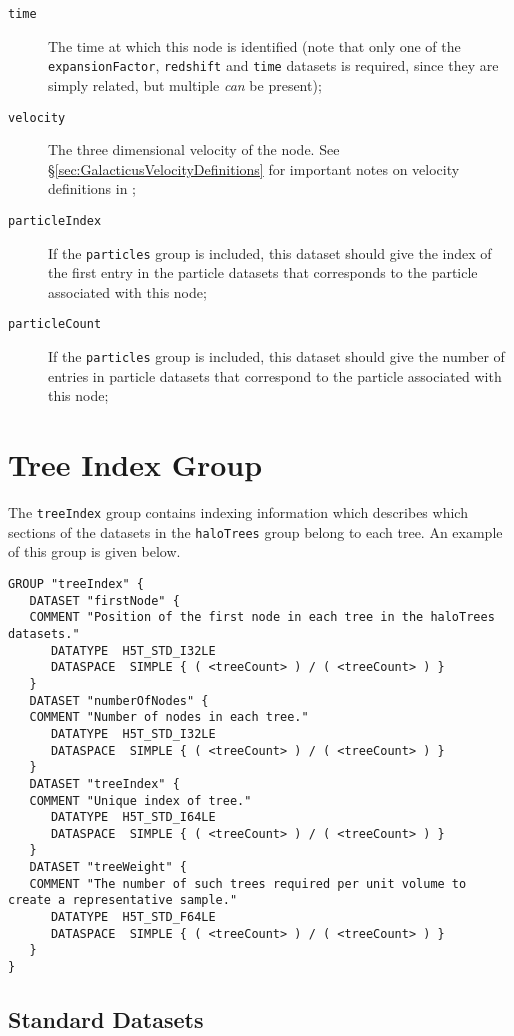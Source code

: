 \begin{description}
 \item [{\tt time}] The time at which this node is identified (note that only one of the {\tt expansionFactor}, {\tt redshift} and {\tt time} datasets is required, since they are simply related, but multiple \emph{can} be present);
 \item [{\tt velocity}] The three dimensional velocity of the node. See \S\ref{sec:GalacticusVelocityDefinitions} for important notes on velocity definitions in \glc;
 \item [{\tt particleIndex}] If the {\tt particles} group is included, this dataset should give the index of the first entry in the particle datasets that corresponds to the particle associated with this node;
 \item [{\tt particleCount}] If the {\tt particles} group is included, this dataset should give the number of entries in particle datasets that correspond to the particle associated with this node;
\end{description}

\section{Tree Index Group}

The {\tt treeIndex} group contains indexing information which describes which sections of the datasets in the {\tt haloTrees} group belong to each tree. An example of this group is given below.

\begin{verbatim}
GROUP "treeIndex" {
   DATASET "firstNode" {
   COMMENT "Position of the first node in each tree in the haloTrees datasets."
      DATATYPE  H5T_STD_I32LE
      DATASPACE  SIMPLE { ( <treeCount> ) / ( <treeCount> ) }
   }
   DATASET "numberOfNodes" {
   COMMENT "Number of nodes in each tree."
      DATATYPE  H5T_STD_I32LE
      DATASPACE  SIMPLE { ( <treeCount> ) / ( <treeCount> ) }
   }
   DATASET "treeIndex" {
   COMMENT "Unique index of tree."
      DATATYPE  H5T_STD_I64LE
      DATASPACE  SIMPLE { ( <treeCount> ) / ( <treeCount> ) }
   }
   DATASET "treeWeight" {
   COMMENT "The number of such trees required per unit volume to create a representative sample."
      DATATYPE  H5T_STD_F64LE
      DATASPACE  SIMPLE { ( <treeCount> ) / ( <treeCount> ) }
   }
}
\end{verbatim}

\subsection{Standard Datasets}

